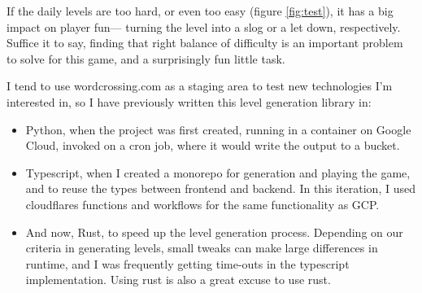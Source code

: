 \documentclass{article}
\begin{document}
If the daily levels are too hard, or even too easy (figure \ref{fig:test}),
it has a big impact on player fun--- turning the level into a slog or a let down, respectively.
Suffice it to say, finding that right balance of difficulty is an important problem to solve for this game, and a
surprisingly fun little task.

\vspace{\baselineskip}
I tend to use wordcrossing.com as a staging area to test new technologies I'm interested in, 
so I have previously written this level generation library in:
\begin{itemize}
  \item Python, when the project was first created, 
    running in a container on Google Cloud, invoked on a cron job,
    where it would write the output to a bucket.
  \item Typescript, when I created a monorepo for generation and playing the game, 
    and to reuse the types between frontend and backend. In this iteration, I used 
    cloudflares functions and workflows for the same functionality as GCP.
  \item And now, Rust, to speed up the level generation process. Depending on our criteria 
    in generating levels, small tweaks can make large differences in runtime, and I was 
    frequently getting time-outs in the typescript implementation. Using rust is also 
    a great excuse to use rust.
  
\end{itemize}
\end{document}
